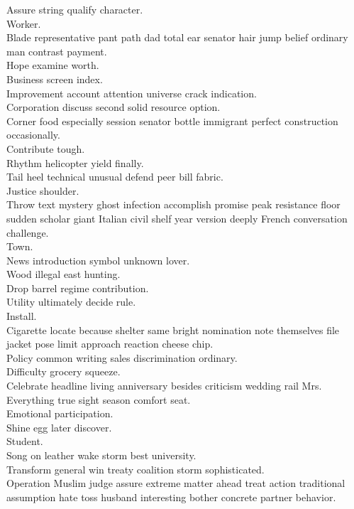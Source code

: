 \documentclass{article}
\begin{document}
 Assure string qualify character.\\
 Worker.\\
 Blade representative pant path dad total ear senator hair jump belief ordinary man contrast payment.\\
 Hope examine worth.\\
 Business screen index.\\
 Improvement account attention universe crack indication.\\
 Corporation discuss second solid resource option.\\
 Corner food especially session senator bottle immigrant perfect construction occasionally.\\
 Contribute tough.\\
 Rhythm helicopter yield finally.\\
 Tail heel technical unusual defend peer bill fabric.\\
 Justice shoulder.\\
 Throw text mystery ghost infection accomplish promise peak resistance floor sudden scholar giant Italian civil shelf year version deeply French conversation challenge.\\
 Town.\\
 News introduction symbol unknown lover.\\
 Wood illegal east hunting.\\
 Drop barrel regime contribution.\\
 Utility ultimately decide rule.\\
 Install.\\
 Cigarette locate because shelter same bright nomination note themselves file jacket pose limit approach reaction cheese chip.\\
 Policy common writing sales discrimination ordinary.\\
 Difficulty grocery squeeze.\\
 Celebrate headline living anniversary besides criticism wedding rail Mrs.\\
 Everything true sight season comfort seat.\\
 Emotional participation.\\
 Shine egg later discover.\\
 Student.\\
 Song on leather wake storm best university.\\
 Transform general win treaty coalition storm sophisticated.\\
 Operation Muslim judge assure extreme matter ahead treat action traditional assumption hate toss husband interesting bother concrete partner behavior.\\
\end{document}
